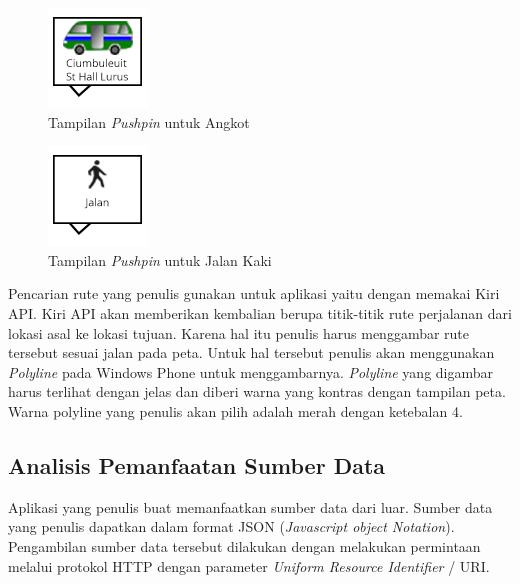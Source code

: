 \begin{figure}[h]
	\centering
		\includegraphics[scale=0.5]{Gambar/out_kiri/angkot}
	\caption{Tampilan \textit{Pushpin} untuk Angkot}
	\label{fig:pushpin_angkot}
\end{figure}

\begin{figure}[h]
	\centering
		\includegraphics[scale=0.5]{Gambar/out_kiri/jalan}
	\caption{Tampilan \textit{Pushpin} untuk Jalan Kaki}
	\label{fig:pushpin_jalan}
\end{figure}

Pencarian rute yang penulis gunakan untuk aplikasi yaitu dengan memakai Kiri API. Kiri API akan memberikan kembalian berupa titik-titik rute perjalanan dari lokasi asal ke lokasi tujuan. Karena hal itu penulis harus menggambar rute tersebut sesuai jalan pada peta. Untuk hal tersebut penulis akan menggunakan \textit{Polyline} pada Windows Phone untuk menggambarnya. \textit{Polyline} yang digambar harus terlihat dengan jelas dan diberi warna yang kontras dengan tampilan peta. Warna polyline yang penulis akan pilih adalah merah dengan ketebalan 4.

\subsection{Analisis Pemanfaatan Sumber Data}
\label{lab:Analisis Pemanfaatan Sumber Data}
\hspace{0.5cm} Aplikasi yang penulis buat memanfaatkan sumber data dari luar. Sumber data yang penulis dapatkan dalam format JSON (\textit{Javascript object Notation}). Pengambilan sumber data tersebut dilakukan dengan melakukan permintaan melalui protokol HTTP dengan parameter \textit{Uniform Resource Identifier} / URI. 

